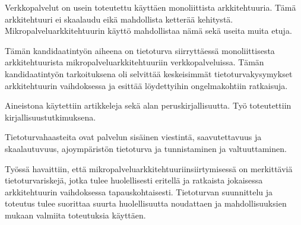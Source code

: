 
\begin{fiabstract}
    \begin{sloppypar}
        Verkkopalvelut on usein toteutettu käyttäen monoliittista 
        arkkitehtuuria. Tämä arkkitehtuuri ei skaalaudu eikä mahdollista 
        ketterää kehitystä. Mikropalveluarkkitehtuurin käyttö mahdollistaa nämä 
        sekä useita muita etuja.
    \end{sloppypar}
    \begin{sloppypar}    
        Tämän kandidaatintyön aiheena on tietoturva siirryttäessä 
        monoliittisesta arkkitehtuurista mikropalveluarkkitehtuuriin 
        verkkopalveluissa. Tämän kandidaatintyön tarkoituksena oli selvittää 
        keskeisimmät tietoturvakysymykset arkkitehtuurin vaihdoksessa ja 
        esittää löydettyihin ongelmakohtiin ratkaisuja.
    \end{sloppypar}
    \begin{sloppypar}
        Aineistona käytettiin artikkeleja sekä alan 
        peruskirjallisuutta. Työ toteutettiin kirjallisuustutkimuksena.
    \end{sloppypar}
    \begin{sloppypar}        
        Tietoturvahaasteita ovat palvelun sisäinen viestintä, saavutettavuus ja 
        skaalautuvuus, ajoympäristön tietoturva ja tunnistaminen ja 
        valtuuttaminen.
    \end{sloppypar}
    \begin{sloppypar}
        Työssä havaittiin, että mikropalveluarkkitehtuuriinsiirtymisessä on 
        merkittäviä tietoturvariskejä, jotka tulee huolellisesti eritellä ja 
        ratkaista jokaisessa arkkitehtuurin vaihdoksessa tapauskohtaisesti. 
        Tietoturvan suunnittelu ja toteutus tulee suorittaa suurta 
        huolellisuutta noudattaen ja mahdollisuuksien mukaan valmiita 
        toteutuksia käyttäen.
    \end{sloppypar}
\end{fiabstract}







